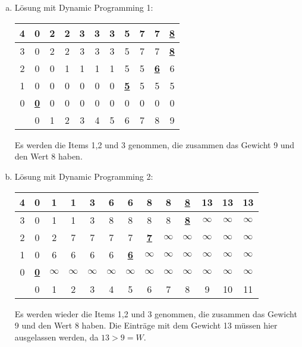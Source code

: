 \documentclass[a4paper]{article}
\begin{document}
	\section{}
\begin{enumerate}[a.)]
\item Lösung mit Dynamic Programming 1: \\

\begin{tabular}{|c||c|c|c|c|c|c|c|c|c|c|}
\hline 
4 & 0 & 2 & 2 & 3 & 3 & 3 & 5 & 7 & 7 & \underline{\textbf{8}} \\ 
\hline 
3 & 0 & 2 & 2 & 3 & 3 & 3 & 5 & 7 & 7 & \underline{\textbf{8}} \\ 
\hline 
2 & 0 & 0 & 1 & 1 & 1 & 1 & 5 & 5 & \underline{\textbf{6}} & 6 \\ 
\hline 
1 & 0 & 0 & 0 & 0 & 0 & 0 & \underline{\textbf{5}} & 5 & 5 & 5 \\ 
\hline 
0 & \underline{\textbf{0}} & 0 & 0 & 0 & 0 & 0 & 0 & 0 & 0 & 0 \\ 
\hline \hline
  & 0 & 1 & 2 & 3 & 4 & 5 & 6 & 7 & 8 & 9 \\ 
\hline 
\end{tabular} 

Es werden die Items 1,2 und 3 genommen, die zusammen das Gewicht 9 und den Wert 8 haben.

	
\item Lösung mit Dynamic Programming 2: \\

\begin{tabular}{|c||c|c|c|c|c|c|c|c|c|c|c|c|}
\hline 
4 & 0 & 1 & 1 & 3 & 6 & 6 & 8 & 8 & \underline{\textbf{8}} & 13 & 13 & 13 \\ 
\hline 
3 & 0 & 1 & 1 & 3 & 8 & 8 & 8 & 8 & \underline{\textbf{8}} & $\infty$ & $\infty$ & $\infty$ \\ 
\hline 
2 & 0 & 2 & 7 & 7 & 7 & 7 & \underline{\textbf{7}} & $\infty$ & $\infty$ & $\infty$ & $\infty$ & $\infty$ \\ 
\hline 
1 & 0 & 6 & 6 & 6 & 6 & \underline{\textbf{6}} & $\infty$ & $\infty$ & $\infty$ & $\infty$ & $\infty$ & $\infty$ \\ 
\hline 
0 & \underline{\textbf{0}} & $\infty$ & $\infty$ & $\infty$ & $\infty$ & $\infty$ & $\infty$ & $\infty$ & $\infty$ & $\infty$ & $\infty$ & $\infty$ \\ 
\hline \hline
 & 0 & 1 & 2 & 3 & 4 & 5 & 6 & 7 & 8 & 9 & 10 & 11 \\ 
\hline 
\end{tabular} 


Es werden wieder die Items 1,2 und 3 genommen, die zusammen das Gewicht 9 und den Wert 8 haben. Die Einträge mit dem Gewicht 13 müssen hier ausgelassen werden, da $ 13 > 9 = W$.

\end{enumerate}
\end{document}
